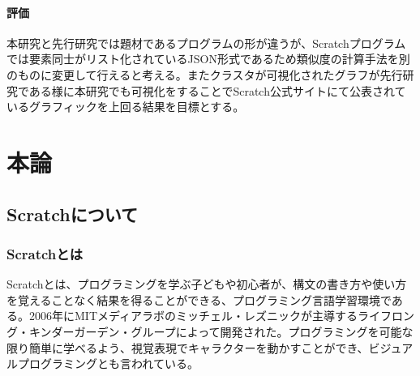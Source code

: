 \documentclass[a4paper,10pt,onecolumn,oneside,openany]{jsbook}
\begin{document}
\subsection{評価}
本研究と先行研究では題材であるプログラムの形が違うが、Scratchプログラムでは要素同士がリスト化されているJSON形式であるため類似度の計算手法を別のものに変更して行えると考える。またクラスタが可視化されたグラフが先行研究である様に本研究でも可視化をすることでScratch公式サイトにて公表されているグラフィックを上回る結果を目標とする。



\part{本論}

\chapter{Scratchについて}
\section{Scratchとは}
Scratchとは、プログラミングを学ぶ子どもや初心者が、構文の書き方や使い方を覚えることなく結果を得ることができる、プログラミング言語学習環境である。2006年にMITメディアラボのミッチェル・レズニックが主導するライフロング・キンダーガーデン・グループによって開発された。プログラミングを可能な限り簡単に学べるよう、視覚表現でキャラクターを動かすことができ、ビジュアルプログラミングとも言われている。
\end{document}
